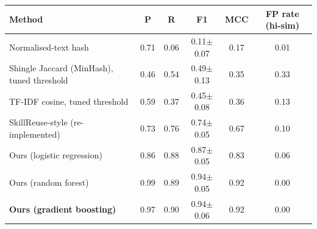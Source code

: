 \begin{tabular}{lccccc}
\toprule
Method & P & R & F1 & MCC & FP rate (hi-sim) \\
\midrule
Normalised-text hash & 0.71 & 0.06 & 0.11$\pm$0.07 & 0.17 & 0.01 \\
Shingle Jaccard (MinHash), tuned threshold & 0.46 & 0.54 & 0.49$\pm$0.13 & 0.35 & 0.33 \\
TF-IDF cosine, tuned threshold & 0.59 & 0.37 & 0.45$\pm$0.08 & 0.36 & 0.13 \\
SkillReuse-style (re-implemented) & 0.73 & 0.76 & 0.74$\pm$0.05 & 0.67 & 0.10 \\
\midrule
Ours (logistic regression) & 0.86 & 0.88 & 0.87$\pm$0.05 & 0.83 & 0.06 \\
Ours (random forest) & 0.99 & 0.89 & 0.94$\pm$0.05 & 0.92 & 0.00 \\
\textbf{Ours (gradient boosting)} & 0.97 & 0.90 & 0.94$\pm$0.06 & 0.92 & 0.00 \\
\bottomrule
\end{tabular}
